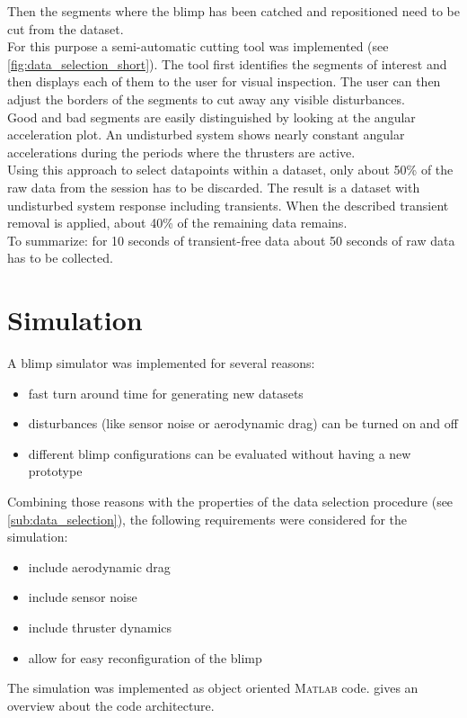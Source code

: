 Then the segments where the blimp has been catched and repositioned need to be cut from the dataset. \\
For this purpose a semi-automatic cutting tool was implemented (see \cref{fig:data_selection_short}). 
The tool first identifies the segments of interest and then displays each of them to the user for visual inspection.
The user can then adjust the borders of the segments to cut away any visible disturbances. \\
Good and bad segments are easily distinguished by looking at the angular acceleration plot.
An undisturbed system shows nearly constant angular accelerations during the periods where the thrusters are active. \\
Using this approach to select datapoints within a dataset, only about 50\% of the raw data from the session has to be discarded.
The result is a dataset with undisturbed system response including transients.
When the described transient removal is applied, about 40\% of the remaining data remains.\\
To summarize: for 10 seconds of transient-free data about 50 seconds of raw data has to be collected.


\section{Simulation}
\label{sec:simulation}
A blimp simulator was implemented for several reasons:
\begin{itemize}
\item fast turn around time for generating new datasets
\item disturbances (like sensor noise or aerodynamic drag) can be turned on and off
\item different blimp configurations can be evaluated without having a new prototype
\end{itemize}

Combining those reasons with the properties of the data selection procedure (see \cref{sub:data_selection}), the following requirements were considered for the simulation:
\begin{itemize}
\item include aerodynamic drag
\item include sensor noise
\item include thruster dynamics
\item allow for easy reconfiguration of the blimp
\end{itemize}
The simulation was implemented as object oriented \textsc{Matlab} code.
 gives an overview about the code architecture.

